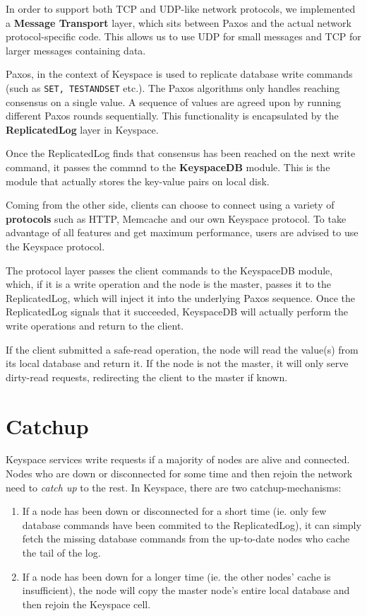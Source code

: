 \documentclass[12pt]{article}
\begin{document}
In order to support both TCP and UDP-like network protocols, we implemented a \textbf{Message Transport} layer, which sits between Paxos and the actual network protocol-specific code. This allows us to use UDP for small messages and TCP for larger messages containing data.

Paxos, in the context of Keyspace is used to replicate database write commands (such as \texttt{SET, TESTANDSET} etc.). The Paxos algorithms only handles reaching consensus on a single value. A sequence of values are agreed upon by running different Paxos rounds sequentially. This functionality is encapsulated by the \textbf{ReplicatedLog} layer in Keyspace.

Once the ReplicatedLog finds that consensus has been reached on the next write command, it passes the commnd to the \textbf{KeyspaceDB} module. This is the module that actually stores the key-value pairs on local disk.

Coming from the other side, clients can choose to connect using a variety of \textbf{protocols} such as HTTP, Memcache and our own Keyspace protocol. To take advantage of all features and get maximum performance, users are advised to use the Keyspace protocol.

The protocol layer passes the client commands to the KeyspaceDB module, which, if it is a write operation and the node is the master, passes it to the ReplicatedLog, which will inject it into the underlying Paxos sequence. Once the ReplicatedLog signals that it succeeded, KeyspaceDB will actually perform the write operations and return to the client.

If the client submitted a safe-read operation, the node will read the value(s) from its local database and return it. If the node is not the master, it will only serve dirty-read requests, redirecting the client to the master if known.

\section{ Catchup }

Keyspace services write requests if a majority of nodes are alive and connected. Nodes who are down or disconnected for some time and then rejoin the network need to \textit{catch up} to the rest. In Keyspace, there are two catchup-mechanisms:

\begin{enumerate}
\item If a node has been down or disconnected for a short time (ie. only few database commands have been commited to the ReplicatedLog), it can simply fetch the missing database commands from the up-to-date nodes who cache the tail of the log.
\item If a node has been down for a longer time (ie. the other nodes' cache is insufficient), the node will copy the master node's entire local database and then rejoin the Keyspace cell.
\end{enumerate}
\end{document}
